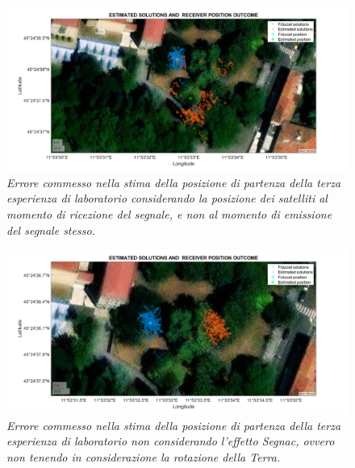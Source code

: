 \documentclass[a4paper,11pt,twoside]{book}
\begin{document}
	\vspace{-1cm}
		
	\begin{figure}[H]
		\centering
		\includegraphics[scale=0.31]{"Immagini workbook/Immagini esp3/err_sat_pos"}
		\caption{\textit{Errore commesso nella stima della posizione di partenza della terza esperienza di laboratorio considerando la posizione dei satelliti al momento di ricezione del segnale, e non al momento di emissione del segnale stesso.}}
		\label{fig:errsatpos3}
	\end{figure}

	\vspace{-1cm}
	
	\begin{figure}[H]
		\centering
		\includegraphics[scale=0.31]{"Immagini workbook/Immagini esp3/err_segnac"}
		\caption{\textit{Errore commesso nella stima della posizione di partenza della terza esperienza di laboratorio non considerando l'effetto Segnac, ovvero non tenendo in considerazione la rotazione della Terra.}}
		\label{fig:errsegnac3}
	\end{figure}

	\vspace{-1cm}
	
\end{document}

